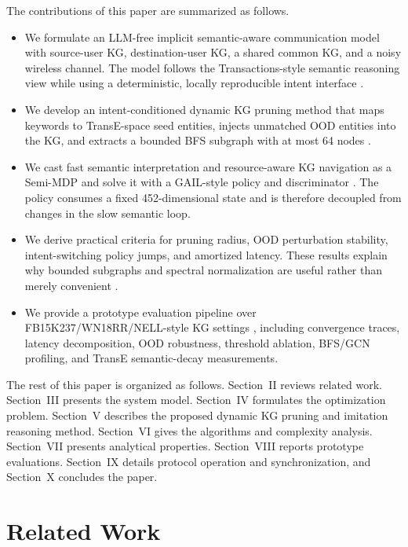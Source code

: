 \documentclass[journal]{IEEEtran}
\begin{document}
The contributions of this paper are summarized as follows.
\begin{itemize}
\item We formulate an LLM-free implicit semantic-aware communication model with source-user KG, destination-user KG, a shared common KG, and a noisy wireless channel. The model follows the Transactions-style semantic reasoning view while using a deterministic, locally reproducible intent interface \cite{xiao2024reasoning,fang2026cross,liao2026hypergraph}.
\item We develop an intent-conditioned dynamic KG pruning method that maps keywords to TransE-space seed entities, injects unmatched OOD entities into the KG, and extracts a bounded BFS subgraph with at most 64 nodes \cite{xie2016transe,bordes2013translating}.
\item We cast fast semantic interpretation and resource-aware KG navigation as a Semi-MDP and solve it with a GAIL-style policy and discriminator \cite{puterman1994mdp,ho2016gail,zhang2025heteroknowledge}. The policy consumes a fixed 452-dimensional state and is therefore decoupled from changes in the slow semantic loop.
\item We derive practical criteria for pruning radius, OOD perturbation stability, intent-switching policy jumps, and amortized latency. These results explain why bounded subgraphs and spectral normalization are useful rather than merely convenient \cite{miyato2018spectral,kipf2017semi}.
\item We provide a prototype evaluation pipeline over FB15K237/WN18RR/NELL-style KG settings \cite{toutanova2015observed,dettmers2018conve}, including convergence traces, latency decomposition, OOD robustness, threshold ablation, BFS/GCN profiling, and TransE semantic-decay measurements.
\end{itemize}

The rest of this paper is organized as follows. Section~II reviews related work. Section~III presents the system model. Section~IV formulates the optimization problem. Section~V describes the proposed dynamic KG pruning and imitation reasoning method. Section~VI gives the algorithms and complexity analysis. Section~VII presents analytical properties. Section~VIII reports prototype evaluations. Section~IX details protocol operation and synchronization, and Section~X concludes the paper.

\section{Related Work}
\end{document}
